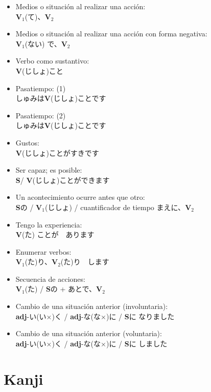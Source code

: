 \documentclass[a4paper,12pt,oneside]{report}
\def\bv{\textbf{V}} %
\def\bs{\textbf{S}} %
\def\adj{\textbf{adj}} %
\def\vi{$\mathrm{\bv}_1$} %
\def\vn{$\mathrm{\bv}_2$} %
\begin{document}
\begin{CJK*}{UTF8}{min}
\begin{itemize}
          \bv(ない)なくてもいいです
    \item Medios o situación al realizar una acción:\\
          \vi(て)、\vn
    \item Medios o situación al realizar una acción con forma negativa:\\
          \vi(ない) で、\vn
    \item Verbo como sustantivo:\\
          \bv(じしょ)こと
    \item Pasatiempo: (1)\\
          しゅみは\bv(じしょ)ことです
    \item Pasatiempo: (2)\\
          しゅみは\bv(じしょ)ことです
    \item Gustos:\\
          \bv(じしょ)ことがすきです
    \item Ser capaz; es posible:\\
          \bs / \bv(じしょ)ことができます
    \item Un acontecimiento ocurre antes que otro:\\
          \bs{の} / \vi(じしょ) / cuantificador de tiempo まえに、\vn
    \item Tengo la experiencia:\\
          \bv(た) ことが　あります
    \item Enumerar verbos:\\
          \vi(た)り、\vn(た)り　します
    \item Secuencia de acciones:\\
          \vi(た) / \bs {の} + あとで、\vn
    \item Cambio de una situaci\'on anterior (involuntaria):\\
          \adj-い(い×){く} / \adj-な(な×){に} / \bs{に} なりました
    \item Cambio de una situaci\'on anterior (voluntaria):\\
          \adj-い(い×){く} / \adj-な(な×){に} / \bs{に} しました
  \end{itemize}


\chapter{Kanji}
  \thispagestyle{contenido} %
  \pagestyle{contenido}     %


\end{CJK*}
\end{document}
